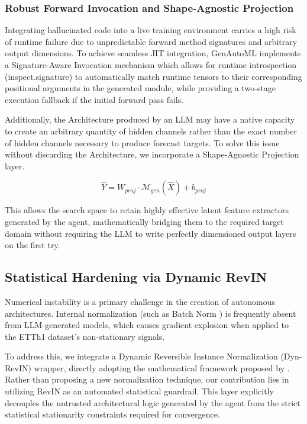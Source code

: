 \documentclass{article}
\begin{document}
\subsubsection{Robust Forward Invocation and Shape-Agnostic Projection}
Integrating hallucinated code into a live training environment carries a high risk of runtime failure due to unpredictable forward method signatures and arbitrary output dimensions. To achieve seamless JIT integration, GenAutoML implements a Signature-Aware Invocation mechanism which allows for runtime introspection (inspect.signature) to automatically match runtime tensors to their corresponding positional arguments in the generated module, while providing a two-stage execution fallback if the initial forward pass fails.

Additionally, the Architecture produced by an LLM may have a native capacity to create an arbitrary quantity of hidden channels rather than the exact number of hidden channels necessary to produce forecast targets. To solve this issue without discarding the Architecture, we incorporate a Shape-Agnostic Projection layer.

$$\hat{Y} = W_{proj} \cdot \mathcal{M}_{gen}(\hat{X}) + b_{proj}$$

This allows the search space to retain highly effective latent feature extractors generated by the agent, mathematically bridging them to the required target domain without requiring the LLM to write perfectly dimensioned output layers on the first try.

\subsection{Statistical Hardening via Dynamic RevIN}
Numerical instability is a primary challenge in the creation of autonomous architectures. Internal normalization (such as Batch Norm \cite{ioffe2015batch}) is frequently absent from LLM-generated models, which causes gradient explosion when applied to the ETTh1 dataset's non-stationary signals\cite{zhou2021informer}.

To address this, we integrate a Dynamic Reversible Instance Normalization (Dyn-RevIN) wrapper, directly adopting the mathematical framework proposed by \cite{kim2022reversible}. Rather than proposing a new normalization technique, our contribution lies in utilizing RevIN as an automated statistical guardrail. This layer explicitly decouples the untrusted architectural logic generated by the agent from the strict statistical stationarity constraints required for convergence.
\end{document}
